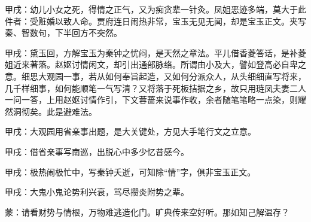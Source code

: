 
\begin{parag}
    \begin{note}甲戌：幼儿小女之死，得情之正气，又为痴贪辈一针灸。凤姐恶迹多端，莫大于此件者：受赃婚以致人命。贾府连日闹热非常，宝玉无见无闻，却是宝玉正文。夹写秦、智数句，下半回方不突然。\end{note}
\end{parag}


\begin{parag}
    \begin{note}甲戌：黛玉回，方解宝玉为秦钟之忧闷，是天然之章法。平儿借香菱答话，是补菱姐近来著落。赵妪讨情闲文，却引出通部脉络。所谓由小及大，譬如登高必自卑之意。细思大观园一事，若从如何奉旨起造，又如何分派众人，从头细细直写将来，几千样细事，如何能顺笔一气写清？又将落于死板拮据之乡，故只用琏凤夫妻二人一问一答，上用赵妪讨情作引，下文蓉蔷来说事作收，余者随笔笔略一点染，则耀然洞彻矣。此是避难法。\end{note}
\end{parag}


\begin{parag}
    \begin{note}甲戌：大观园用省亲事出题，是大关键处，方见大手笔行文之立意。\end{note}
\end{parag}


\begin{parag}
    \begin{note}甲戌：借省亲事写南巡，出脱心中多少忆昔感今。\end{note}
\end{parag}


\begin{parag}
    \begin{note}甲戌：极热闹极忙中，写秦钟夭逝，可知除“情”字，俱非宝玉正文。\end{note}
\end{parag}


\begin{parag}
    \begin{note}甲戌：大鬼小鬼论势利兴衰，骂尽攒炎附势之辈。\end{note}
\end{parag}


\begin{parag}
    \begin{note}蒙：请看财势与情根，万物难逃造化门。旷典传来空好听。那如知己解温存？\end{note}
\end{parag}


